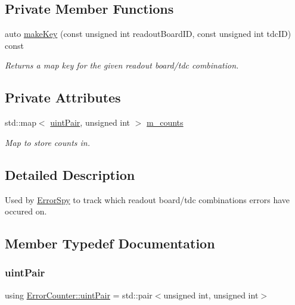 \subsection*{Private Member Functions}
\begin{DoxyCompactItemize}
\item 
auto \hyperlink{class_error_counter_aa54fb5fe5884956ba9d8ca8b44f74fcb}{make\+Key} (const unsigned int readout\+Board\+ID, const unsigned int tdc\+ID) const
\begin{DoxyCompactList}\small\item\em Returns a map key for the given readout board/tdc combination. \end{DoxyCompactList}\end{DoxyCompactItemize}
\subsection*{Private Attributes}
\begin{DoxyCompactItemize}
\item 
std\+::map$<$ \hyperlink{class_error_counter_aa50fc471c675ff8d626b982d1d90c7b4}{uint\+Pair}, unsigned int $>$ \hyperlink{class_error_counter_a66d01d8e49111d2f433b56bf922c418e}{m\+\_\+counts}
\begin{DoxyCompactList}\small\item\em Map to store counts in. \end{DoxyCompactList}\end{DoxyCompactItemize}


\subsection{Detailed Description}
Used by \hyperlink{class_error_spy}{Error\+Spy} to track which readout board/tdc combinations errors have occured on. 

\subsection{Member Typedef Documentation}
\mbox{\label{class_error_counter_aa50fc471c675ff8d626b982d1d90c7b4}} 
\subsubsection{\texorpdfstring{uint\+Pair}{uintPair}}
{\footnotesize\ttfamily using \hyperlink{class_error_counter_aa50fc471c675ff8d626b982d1d90c7b4}{Error\+Counter\+::uint\+Pair} =  std\+::pair$<$unsigned int, unsigned int$>$\hspace{0.3cm}{\ttfamily [private]}}



